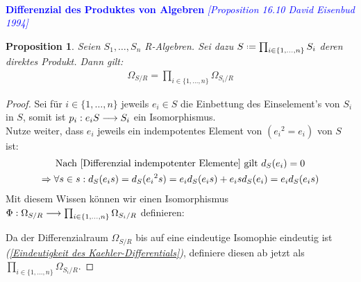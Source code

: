 \documentclass[10pt,a4paper]{report}
\newcommand{\ModulsOfDifferenzials}{David Eisenbud 1994}
\newcounter{Aussage}[chapter]
\newtheorem{prop}[Aussage]{Proposition}
\newcommand{\functionfront}[3]{\nolinebreak{#1:#2 \longrightarrow #3}}
\newcommand{\divR}[2]{\Omega_{#1/#2}}
\newcommand{\divf}[1]{d_{#1}}
\newcommand*{\defeq}{\mathrel{\vcenter{\baselineskip0.5ex \lineskiplimit0pt
                     \hbox{\scriptsize.}\hbox{\scriptsize.}}}%
                     =}
\begin{document}
\ \\
\textcolor{blue}{\textbf{Differenzial des Produktes von Algebren} \textit{[Proposition 16.10 \ModulsOfDifferenzials]}}
\begin{prop}\label{Differenzial des Produktes von Algebren}
Seien $S_1, \dots , S_n$ R-Algebren. Sei dazu $S \defeq \prod_{i \in \lbrace 1, \dots , n \rbrace} S_i$ deren direktes Produkt.
Dann gilt:
\begin{gather*}
\divR{S}{R} = \prod_{i \in \lbrace 1, \dots , n \rbrace} \divR{S_i}{R}
\end{gather*}
\end{prop}
\begin{proof}
Sei für $i \in \lbrace 1, \dots ,n \rbrace$ jeweils $e_i \in S$ die Einbettung des Einselement's von $S_i$ in $S$, somit ist $\functionfront{p_i}{e_iS}{S_i}$ ein Isomorphismus.\\
Nutze weiter, dass $e_i$ jeweils ein indempotentes Element von $({e_i}^2 = e_i)$ von $S$ ist:
\begin{gather*}
\text{Nach \cref{Differenzial indempotenter Elemente} gilt } \divf{S}(e_i) = 0 \\
\Rightarrow \forall s \in s : \divf{S}(e_is)= \divf{S}({e_i}^2s) = e_i\divf{S}(e_is) + e_is\divf{S}(e_i) = e_i\divf{S}(e_is) \\
\end{gather*}
Mit diesem Wissen können wir einen Isomorphismus $\functionfront{\Phi}{\divR{S}{R}}{\prod_{i \in \lbrace 1, \dots , n \rbrace} \divR{S_i}{R}}$ definieren:
\begin{center}
\end{center}
Da der Differenzialraum $\divR{S}{R}$ bis auf eine eindeutige Isomophie eindeutig ist \textit{(\cref{Eindeutigkeit des Kaehler-Differentials})}, definiere diesen ab jetzt als $\prod_{i \in \lbrace 1, \dots , n \rbrace} \divR{S_i}{R}$.
\end{proof}
\end{document}
